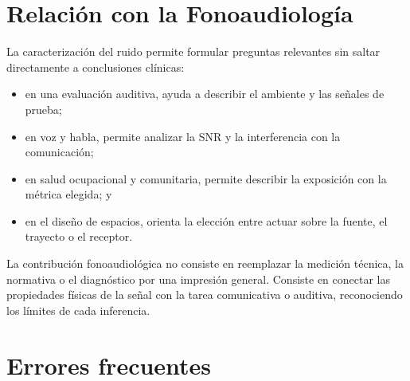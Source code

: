 \section{Relación con la Fonoaudiología}
\label{sec:u10-fonoaudiologia}

La caracterización del ruido permite formular preguntas relevantes sin saltar
directamente a conclusiones clínicas:
\begin{itemize}
    \item en una evaluación auditiva, ayuda a describir el ambiente y las
    señales de prueba;
    \item en voz y habla, permite analizar la SNR y la interferencia con la
    comunicación;
    \item en salud ocupacional y comunitaria, permite describir la exposición
    con la métrica elegida; y
    \item en el diseño de espacios, orienta la elección entre actuar sobre la
    fuente, el trayecto o el receptor.
\end{itemize}

La contribución fonoaudiológica no consiste en reemplazar la medición técnica,
la normativa o el diagnóstico por una impresión general. Consiste en conectar
las propiedades físicas de la señal con la tarea comunicativa o auditiva,
reconociendo los límites de cada inferencia.

\section{Errores frecuentes}
\label{sec:u10-errores}

